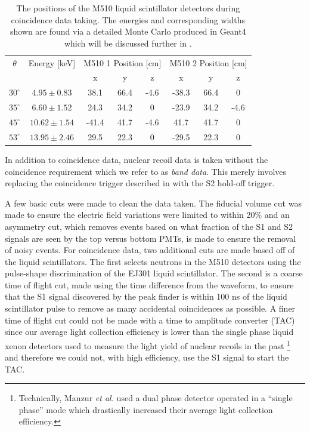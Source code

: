 \begin{table}[t]
\centering
\def\arraystretch{1.3}
\begin{tabular}{cc|ccc|ccc}
\hline
$\theta$ & Energy [keV] & \multicolumn{3}{c|}{M510 1 Position [cm]} & \multicolumn{3}{c}{M510 2 Position [cm]} \\
 & & x & y & z & x & y & z \\
\hline
$30^{\circ}$ & $4.95 \pm 0.83$ & 38.1 & 66.4 & -4.6 & -38.3 & 66.4 & 0 \\
$35^{\circ}$ & $6.60 \pm 1.52$ & 24.3 & 34.2 & 0 & -23.9 & 34.2 & -4.6 \\
$45^{\circ}$ & $10.62 \pm 1.54$ & -41.4 & 41.7 & -4.6 & 41.7 & 41.7 & 0 \\
$53^{\circ}$ & $13.95 \pm 2.46$ & 29.5 & 22.3 & 0 & -29.5 & 22.3 & 0 \\
\hline
\end{tabular}
\caption{The positions of the M510 liquid scintillator detectors during coincidence data taking.  The energies and corresponding widths shown are found via a detailed Monte Carlo produced in Geant4 which will be discussed further in .}
\label{tab:nerix_ej_positions}
\end{table}

In addition to coincidence data, nuclear recoil data is taken without the coincidence requirement which we refer to as \textit{band data}.  This merely involves replacing the coincidence trigger described in  with the S2 hold-off trigger.

A few basic cuts were made to clean the data taken.  The fiducial volume cut was made to ensure the electric field variations were limited to within 20\% and an asymmetry cut, which removes events based on what fraction of the S1 and S2 signals are seen by the top versus bottom PMTs, is made to ensure the removal of noisy events.  For coincidence data, two additional cuts are made based off of the liquid scintillators.  The first selects neutrons in the M510 detectors using the pulse-shape discrimination of the EJ301 liquid scintillator.  The second is a coarse time of flight cut, made using the time difference from the waveform, to ensure that the S1 signal discovered by the peak finder is within 100 ns of the liquid scintillator pulse to remove as many accidental coincidences as possible.  A finer time of flight cut could not be made with a time to amplitude converter (TAC) since our average light collection efficiency is lower than the single phase liquid xenon detectors used to measure the light yield of nuclear recoils in the past \cite{aprile2009new, manzur2010scintillation, plante2011new}\footnote{Technically,  Manzur \textit{et al.} used a dual phase detector operated in a ``single phase'' mode which drastically increased their average light collection efficiency.} and therefore we could not, with high efficiency, use the S1 signal to start the TAC.  %


